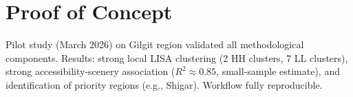 \documentclass[12pt, a4paper]{article}
\begin{document}
\section{Proof of Concept}

Pilot study (March 2026) on Gilgit region validated all methodological components. Results: strong local LISA clustering (2 HH clusters, 7 LL clusters), strong accessibility-scenery association ($R^2 \approx 0.85$, small-sample estimate), and identification of priority regions (e.g., Shigar). Workflow fully reproducible.
\end{document}
